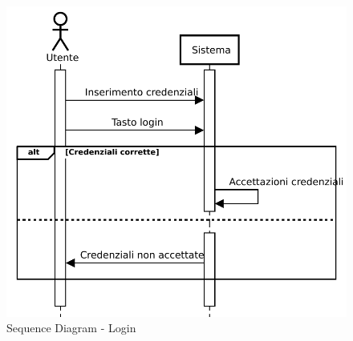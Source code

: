 \documentclass[a4paper,11pt]{article}
\begin{document}
\begin{figure}[htpb]
	\centering
	\includegraphics[width=1\textwidth]{diagrams/Sequence_Diagram_-_Login_1.pdf}
	\caption{Sequence Diagram - Login}
	\label{fig:seq_dia_login}
\end{figure}




\newpage
\end{document}
